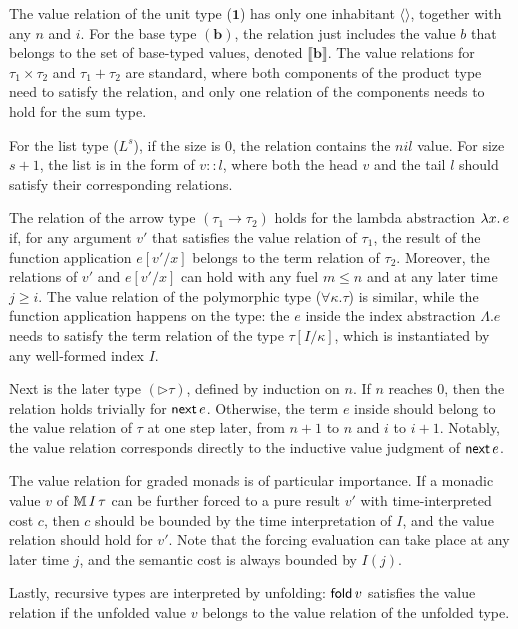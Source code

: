 The value relation of the unit type ($\textbf{1}$) has only one inhabitant $\langle\rangle$, together with any $n$ and $i$.
For the base type $(\textbf{b})$, the relation just includes the value $b$ that belongs to the set of base-typed values, denoted $\llbracket \textbf{b} \rrbracket$.
The value relations for $\tau_1 \times \tau_2$ and $\tau_1 + \tau_2$ are standard, where both components of the product type need to satisfy the relation,
and only one relation of the components needs to hold for the sum type.

For the list type ($L^s$), if the size is 0, the relation contains the $nil$ value. For size $s+1$, the list is in the form of $v::l$,
where both the head $v$ and the tail $l$ should satisfy their corresponding relations.

The relation of the arrow type $(\tau_1 \to \tau_2)$ holds for the lambda abstraction $\lambda x.\,e$
if, for any argument $v'$ that satisfies the value relation of $\tau_1$, the result of the function application $e[v'/x]$ 
belongs to the term relation of $\tau_2$. Moreover, the relations of $v'$ and $e[v'/x]$ can hold with any fuel $m \leq n$ and at any later time $j \geq i$.
The value relation of the polymorphic type ($\forall\kappa.\tau$) is similar, while the function application happens on the type: the $e$ inside 
the index abstraction $\Lambda.e$ needs to satisfy the term relation of the type $\tau[I/\kappa]$, which is instantiated by any well-formed index $I$.

Next is the later type $(\triangleright \tau)$, defined by induction on $n$. If $n$ reaches 0, then 
the relation holds trivially for $\mathsf{next}\, e$. Otherwise, the term $e$ inside should belong to the value relation of $\tau$ at one step later, from $n+1$ to $n$ and $i$ to $i+1$. Notably, the value relation corresponds directly to the inductive value judgment of $\mathsf{next}\, e$.

The value relation for graded monads is of particular importance. If a monadic value $v$ of $\mathbb{M}\,{I}\, \tau$ can be further forced 
to a pure result $v'$ with time-interpreted cost $c$, then $c$ should be bounded by the time interpretation of $I$, and the value relation should hold
for $v'$. Note that the forcing evaluation can take place at any later time $j$, and the semantic cost is always bounded by $I(j)$.

Lastly, recursive types are interpreted by unfolding: $\mathsf{fold}\, v$ satisfies the value relation if the unfolded value $v$ belongs to the value relation of the unfolded type.

